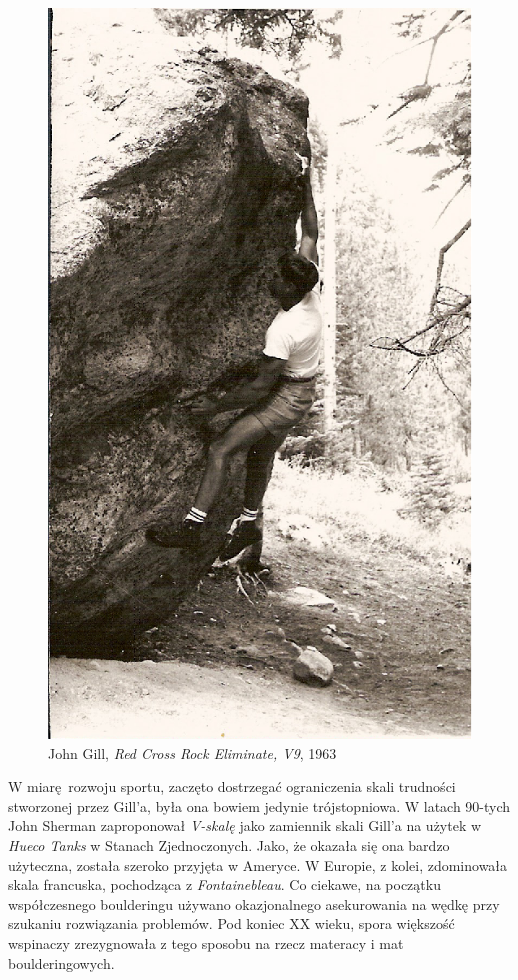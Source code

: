 \documentclass{article}
\begin{document}
\begin{figure}[!htbp]
	\begin{center}
		\includegraphics[width=0.5\linewidth]{images/gill-1.eps}
	\end{center}
	\caption{John Gill, \textit{Red Cross Rock Eliminate, V9}, 1963 \cite{gill-wiki}}
	\label{gill-1}
\end{figure}

W miarę rozwoju sportu, zaczęto dostrzegać ograniczenia skali trudności stworzonej przez Gill'a, była ona bowiem jedynie trójstopniowa. W latach 90-tych John Sherman zaproponował \textit{V-skalę} jako zamiennik skali Gill'a na użytek w \textit{Hueco Tanks} w Stanach Zjednoczonych. Jako, że okazała się ona bardzo użyteczna, została szeroko przyjęta w Ameryce. W Europie, z kolei, zdominowała skala francuska, pochodząca z \textit{Fontainebleau}. Co ciekawe, na początku współczesnego boulderingu używano okazjonalnego asekurowania na wędkę przy szukaniu rozwiązania problemów. Pod koniec XX wieku, spora większość wspinaczy zrezygnowała z tego sposobu na rzecz materacy i mat boulderingowych.
\end{document}
